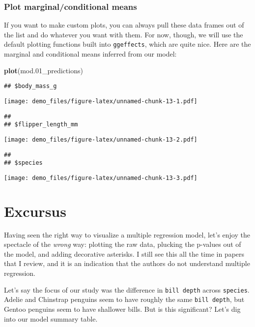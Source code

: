 \documentclass[
]{article}
\newenvironment{Shaded}{\begin{snugshade}}{\end{snugshade}}
\newcommand{\FloatTok}[1]{\textcolor[rgb]{0.00,0.00,0.81}{#1}}
\newcommand{\FunctionTok}[1]{\textcolor[rgb]{0.13,0.29,0.53}{\textbf{#1}}}
\newcommand{\NormalTok}[1]{#1}
\begin{document}
\hypertarget{plot-marginalconditional-means}{%
\subsubsection{Plot marginal/conditional
means}\label{plot-marginalconditional-means}}

If you want to make custom plots, you can always pull these data frames
out of the list and do whatever you want with them. For now, though, we
will use the default plotting functions built into \texttt{ggeffects},
which are quite nice. Here are the marginal and conditional means
inferred from our model:

\begin{Shaded}
\begin{Highlighting}[]
\FunctionTok{plot}\NormalTok{(mod}\FloatTok{.01}\NormalTok{\_predictions)}
\end{Highlighting}
\end{Shaded}

\begin{verbatim}
## $body_mass_g
\end{verbatim}

\texttt{[image: demo\_files/figure-latex/unnamed-chunk-13-1.pdf]}

\begin{verbatim}
## 
## $flipper_length_mm
\end{verbatim}

\texttt{[image: demo\_files/figure-latex/unnamed-chunk-13-2.pdf]}

\begin{verbatim}
## 
## $species
\end{verbatim}

\texttt{[image: demo\_files/figure-latex/unnamed-chunk-13-3.pdf]}

\hypertarget{excursus}{%
\section{Excursus}\label{excursus}}

Having seen the right way to visualize a multiple regression model,
let's enjoy the spectacle of the \emph{wrong} way: plotting the raw
data, plucking the p-values out of the model, and adding decorative
asterisks. I still see this all the time in papers that I review, and it
is an indication that the authors do not understand multiple regression.

Let's say the focus of our study was the difference in
\texttt{bill\ depth} across \texttt{species}. Adelie and Chinstrap
penguins seem to have roughly the same \texttt{bill\ depth}, but Gentoo
penguins seem to have shallower bills. But is this significant? Let's
dig into our model summary table.
\end{document}

